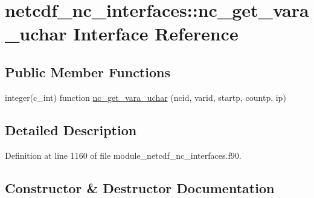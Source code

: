 \hypertarget{interfacenetcdf__nc__interfaces_1_1nc__get__vara__uchar}{}\section{netcdf\+\_\+nc\+\_\+interfaces\+:\+:nc\+\_\+get\+\_\+vara\+\_\+uchar Interface Reference}
\label{interfacenetcdf__nc__interfaces_1_1nc__get__vara__uchar}
\subsection*{Public Member Functions}
\begin{DoxyCompactItemize}
\item 
integer(c\+\_\+int) function \hyperlink{interfacenetcdf__nc__interfaces_1_1nc__get__vara__uchar_a3fe3226aef7f0b9cf172c6ec0e0a2337}{nc\+\_\+get\+\_\+vara\+\_\+uchar} (ncid, varid, startp, countp, ip)
\end{DoxyCompactItemize}


\subsection{Detailed Description}


Definition at line 1160 of file module\+\_\+netcdf\+\_\+nc\+\_\+interfaces.\+f90.



\subsection{Constructor \& Destructor Documentation}
\mbox{\label{interfacenetcdf__nc__interfaces_1_1nc__get__vara__uchar_a3fe3226aef7f0b9cf172c6ec0e0a2337}} 
